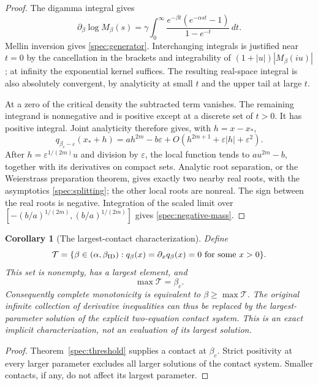 \documentclass[11pt,a4paper]{article}
\newtheorem{corollary}[theorem]{Corollary}
\theoremstyle{definition}
\theoremstyle{remark}
\numberwithin{equation}{section}
\begin{document}
\begin{proof}
The digamma integral gives
\[
 \partial_\beta\log M_\beta(s)
  =\gamma\int_0^\infty
       \frac{e^{-\beta t}(e^{-\alpha st}-1)}{1-e^{-t}}\,dt.
\]
Mellin inversion gives \eqref{spec:generator}.  Interchanging integrals
is justified near \(t=0\) by the cancellation in the brackets and
integrability of \((1+|u|)|M_\beta(iu)|\); at infinity the exponential
kernel suffices.  The resulting real-space integral is also absolutely
convergent, by analyticity at small \(t\) and the upper tail at large
\(t\).

At a zero of the critical density the subtracted term vanishes.
The remaining integrand is nonnegative and is positive except at a
discrete set of \(t>0\).  It has positive integral.  Joint analyticity
therefore gives, with \(h=x-x_*\),
\[
 q_{\beta_c-\varepsilon}(x_*+h)
    =a h^{2m}-b\varepsilon
        +O(h^{2m+1}+\varepsilon |h|+\varepsilon^2).
\]
After \(h=\varepsilon^{1/(2m)}u\) and division by \(\varepsilon\),
the local function tends to \(au^{2m}-b\), together with its derivatives
on compact sets.  Analytic root separation, or the Weierstrass preparation
theorem, gives exactly two nearby real roots, with the asymptotics
\eqref{spec:splitting}; the other local roots are nonreal.  The sign
between the real roots is negative.  Integration of the scaled limit
over \([-(b/a)^{1/(2m)},(b/a)^{1/(2m)}]\) gives
\eqref{spec:negative-mass}.
\end{proof}

\begin{corollary}[The largest-contact characterization]\label{spec:largest-contact}
Define
\[
 \mathcal T=\{\beta\in(\alpha,\beta_{\rm ID}):
       q_\beta(x)=\partial_xq_\beta(x)=0
       \text{ for some }x>0\}.
\]
This set is nonempty, has a largest element, and
\[
              \max\mathcal T=\beta_c.
\]
Consequently complete monotonicity is equivalent to
\(\beta\ge\max\mathcal T\).  The original infinite collection of
derivative inequalities can thus be replaced by the largest-parameter
solution of the explicit two-equation contact system.  This is an exact
implicit characterization, not an evaluation of its largest solution.
\end{corollary}

\begin{proof}
Theorem~\ref{spec:threshold} supplies a contact at \(\beta_c\).
Strict positivity at every larger parameter excludes all larger
solutions of the contact system.  Smaller contacts, if any, do not
affect its largest parameter.
\end{proof}
\end{document}
